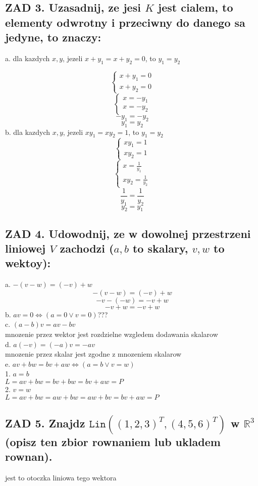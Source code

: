 \documentclass{article}
\newcommand{\R}{\mathbb{R}}
\begin{document}
\subsection*{\color{tit}ZAD 3. \color{txt}Uzasadnij, ze jesi $K$ jest cialem, to elementy odwrotny i przeciwny do danego sa jedyne, to znaczy:}
a. dla kazdych $x, y$, jezeli $x+y_1=x+y_2=0$, to $y_1=y_2$\smallskip\par
  $$\begin{cases}x+y_1=0\\x+y_2=0\end{cases}$$
  $$\begin{cases}x=-y_1\\x=-y_2\end{cases}$$
  $$-y_1=-y_2$$
  $$y_1=y_2$$
b. dla kazdych $x, y$, jezeli $xy_1=xy_2=1$, to $y_1=y_2$
  $$\begin{cases}xy_1=1\\xy_2=1\end{cases}$$
  $$\begin{cases}x=\frac1{y_1}\\xy_2=\frac1{y_2}\end{cases}$$
  $$\frac1{y_1}=\frac1{y_2}$$
  $$y_2=y_1$$
\subsection*{\color{tit}ZAD 4. \color{txt}Udowodnij, ze w dowolnej przestrzeni liniowej $V$ zachodzi ($a, b$ to skalary, $v, w$ to wektoy):}
a. $-(v-w)=(-v)+w$
  $$-(v-w)=(-v)+w$$
  $$-v-(-w)=-v+w$$
  $$-v+w=-v+w$$
b. $av=0\iff(a=0\lor v=0)$???\\
c. $(a-b)v=av-bv$\\
  mnozenie przez wektor jest rozdzielne wzgledem dodawania skalarow\\
d. $a(-v)=(-a)v=-av$\\
  mnozenie przez skalar jest zgodne z mnozeniem skalarow\\
e. $av+bw=bv+aw\iff(a=b\lor v=w)$\\
  1. $a=b$\\
  $L=av+bw=bv+bw=bv+aw=P$\\
  2. $v=w$\\
  $L=av+bw=aw+bw=aw+bv=bv+aw=P$
\subsection*{\color{tit}ZAD 5. \color{txt}Znajdz $\texttt{Lin}((1, 2, 3)^T, (4, 5, 6)^T)$ w $\R^3$ (opisz ten zbior rownaniem lub ukladem rownan).}
jest to otoczka liniowa tego wektora
\end{document}
